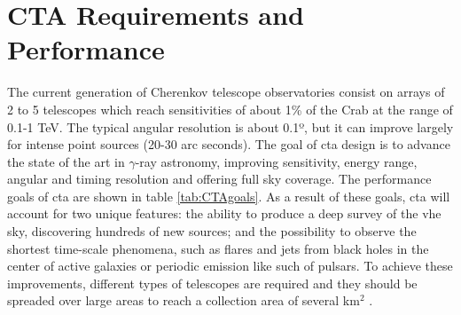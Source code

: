 \documentclass[main.tex]{subfiles}
\begin{document}
\section{CTA Requirements and Performance} \label{sec:ctaperformance}

The current generation of Cherenkov telescope observatories consist on arrays of 2 to 5 telescopes which reach sensitivities of about 1\% of the Crab at the range of 0.1-1 TeV. The typical angular resolution is about 0.1º, but it can improve largely for intense point sources (20-30 arc seconds). The goal of \gls{cta} design is to advance the state of the art in $\gamma$-ray astronomy, improving sensitivity, energy range, angular and timing resolution and offering full sky coverage. The performance goals of \gls{cta} are shown in table \ref{tab:CTAgoals}. As a result of these goals, \gls{cta} will account for two unique features: the ability to produce a deep survey of the \gls{vhe} sky, discovering hundreds of new sources; and the possibility to observe the shortest time-scale phenomena, such as flares and jets from black holes in the center of active galaxies or periodic emission like such of pulsars. 
To achieve these improvements, different types of telescopes are required and they should be spreaded over large areas to reach a collection area of several km$^2$ \cite{CTAconcept}.
\end{document}
